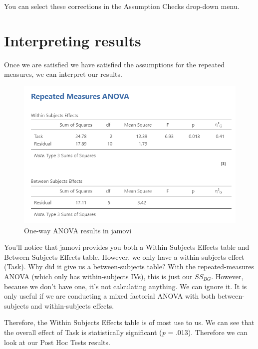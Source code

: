 \documentclass[
]{book}
\begin{document}
You can select these corrections in the Assumption Checks drop-down menu.

\hypertarget{interpreting-results-3}{%
\section{Interpreting results}\label{interpreting-results-3}}

Once we are satisfied we have satisfied the assumptions for the repeated measures, we can interpret our results.

\begin{figure}

{\centering \includegraphics[width=1\linewidth]{images/05-repeated-measures-anova/rm-anova_results} 

}

\caption{One-way ANOVA results in jamovi}\label{fig:unnamed-chunk-7}
\end{figure}

You'll notice that jamovi provides you both a Within Subjects Effects table and Between Subjects Effects table. However, we only have a within-subjects effect (Task). Why did it give us a between-subjects table? With the repeated-measures ANOVA (which only has within-subjects IVs), this is just our \(SS_{BG}\). However, because we don't have one, it's not calculating anything. We can ignore it. It is only useful if we are conducting a mixed factorial ANOVA with both between-subjects and within-subjects effects.

Therefore, the Within Subjects Effects table is of most use to us. We can see that the overall effect of Task is statistically significant (\emph{p} = .013). Therefore we can look at our Post Hoc Tests results.
\end{document}

